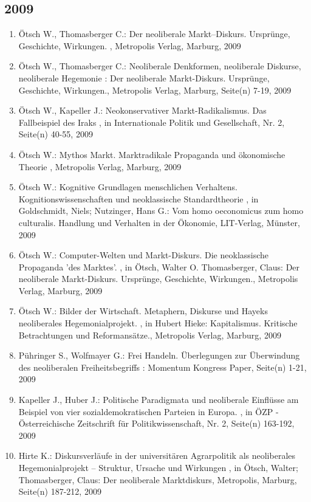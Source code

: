  \subsection*{2009} 
 \begin{enumerate}[leftmargin=*, labelsep=0.5cm] 
	 \item Ötsch W., Thomasberger C.:  Der neoliberale Markt–Diskurs. Ursprünge, Geschichte, Wirkungen.  , Metropolis Verlag, Marburg, 2009
	 \item Ötsch W., Thomasberger C.:  Neoliberale Denkformen, neoliberale Diskurse, neoliberale Hegemonie  : Der neoliberale Markt-Diskurs. Ursprünge, Geschichte, Wirkungen., Metropolis Verlag, Marburg, Seite(n) 7-19, 2009
	 \item Ötsch W., Kapeller J.:  Neokonservativer Markt-Radikalismus. Das Fallbeispiel des Iraks  , in Internationale Politik und Gesellschaft, Nr. 2, Seite(n) 40-55, 2009
	 \item Ötsch W.:  Mythos Markt. Marktradikale Propaganda und ökonomische Theorie  , Metropolis Verlag, Marburg, 2009
	 \item Ötsch W.:  Kognitive Grundlagen menschlichen Verhaltens. Kognitionswissenschaften und neoklassische Standardtheorie  , in Goldschmidt, Niels; Nutzinger, Hans G.: Vom homo oeconomicus zum homo culturalis. Handlung und Verhalten in der Ökonomie, LIT-Verlag, Münster, 2009
	 \item Ötsch W.:  Computer-Welten und Markt-Diskurs. Die neoklassische Propaganda 'des Marktes'.  , in Ötsch, Walter O. Thomasberger, Claus: Der neoliberale Markt-Diskurs. Ursprünge, Geschichte, Wirkungen., Metropolis Verlag, Marburg, 2009
	 \item Ötsch W.:  Bilder der Wirtschaft. Metaphern, Diskurse und Hayeks neoliberales Hegemonialprojekt.  , in Hubert Hieke: Kapitalismus. Kritische Betrachtungen und Reformansätze., Metropolis Verlag, Marburg, 2009
	 \item Pühringer S., Wolfmayer G.:  Frei Handeln. Überlegungen zur Überwindung des neoliberalen Freiheitsbegriffs  : Momentum Kongress Paper, Seite(n) 1-21, 2009
	 \item Kapeller J., Huber J.:  Politische Paradigmata und neoliberale Einflüsse am Beispiel von vier sozialdemokratischen Parteien in Europa.  , in ÖZP - Österreichische Zeitschrift für Politikwissenschaft, Nr. 2, Seite(n) 163-192, 2009
	 \item Hirte K.:  Diskursverläufe in der universitären Agrarpolitik als neoliberales Hegemonialprojekt – Struktur, Ursache und Wirkungen  , in Ötsch, Walter; Thomasberger, Claus: Der neoliberale Marktdiskurs, Metropolis, Marburg, Seite(n) 187-212, 2009

\end{enumerate}

